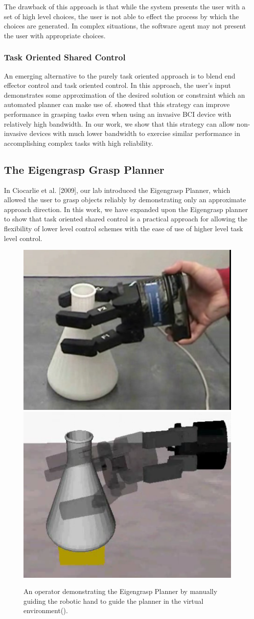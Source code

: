 The drawback of this approach is that while the system presents the user with a set of high level choices, the user is not able to effect the process by which the choices are generated. In complex situations, the software agent may not present the user with appropriate choices. 

\subsubsection{Task Oriented Shared Control}
An emerging alternative to the purely task oriented approach is to blend end effector control and task oriented control. In this approach, the user's input demonstrates some approximation of the desired solution or constraint which an automated planner can make use of. \cite{Mulling2015} showed that this strategy can improve performance in grasping tasks even when using an invasive BCI device with relatively high bandwidth. In our work, we show that this strategy can allow non-invasive devices with much lower bandwidth to exercise similar performance in accomplishing complex tasks with high reliability. 

\subsection{The Eigengrasp Grasp Planner}
 In Ciocarlie et al. [2009], our lab introduced the Eigengrasp Planner, which allowed the user to grasp objects reliably by demonstrating only an approximate approach direction. In this work, we have expanded upon the Eigengrasp planner to show that task oriented shared control is a practical approach for allowing the flexibility of lower level control schemes with the ease of use of higher level task level control. 

\begin{figure}[hb]
\centering
	\includegraphics[width=.49\textwidth]{images_2/real_eg_grasp.png}
	\includegraphics[width=.49\textwidth]{images_2/simulated_eg_grasp2.png}
	\caption{An operator demonstrating the Eigengrasp Planner by manually guiding the robotic hand to guide the planner in the virtual environment(\cite{CiocarlieIJRR}).}
	\label{fig:egplanner_demo} 
\end{figure}


